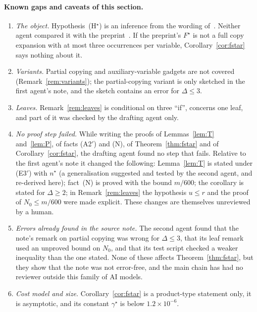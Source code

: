\documentclass[11pt,a4paper]{article}
\theoremstyle{definition}
\theoremstyle{remark}
\begin{document}
\paragraph{Known gaps and caveats of this section.}
\begin{enumerate}
\item \emph{The object.} Hypothesis~(H$^\star$) is an inference from the wording
 of~\cite{DL}. Neither agent compared it with the preprint~\cite{OpenAI}. If the preprint's
 $F^\star$ is not a full copy expansion with at most three occurrences per variable,
 Corollary~\ref{cor:fstar} says nothing about it.
\item \emph{Variants.} Partial copying and auxiliary-variable gadgets are not covered
 (Remark~\ref{rem:variants}); the partial-copying variant is only sketched in the first
 agent's note, and the sketch contains an error for $\Delta\le3$.
\item \emph{Leaves.} Remark~\ref{rem:leaves} is conditional on three ``if'', concerns one
 leaf, and part of it was checked by the drafting agent only.
\item \emph{No proof step failed.} While writing the proofs of Lemmas~\ref{lem:T}
 and~\ref{lem:P}, of facts (A2$'$) and (N), of Theorem~\ref{thm:fstar} and of
 Corollary~\ref{cor:fstar}, the drafting agent found no step that fails. Relative to the
 first agent's note it changed the following: Lemma~\ref{lem:T} is stated under (E3$'$) with
 $n^\star$ (a generalisation suggested and tested by the second agent, and re-derived here);
 fact~(N) is proved with the bound $m/600$; the corollary is stated for $\Delta\ge2$; in
 Remark~\ref{rem:leaves} the hypothesis $u\le r$ and the proof of $N_0\le m/600$ were made
 explicit. These changes are themselves unreviewed by a human.
\item \emph{Errors already found in the source note.} The second agent found that the
 note's remark on partial copying was wrong for $\Delta\le3$, that its leaf remark used an
 unproved bound on $N_0$, and that its test script checked a weaker inequality than the one
 stated. None of these affects Theorem~\ref{thm:fstar}, but they show that the note was not
 error-free, and the main chain has had no reviewer outside this family of AI models.
\item \emph{Cost model and size.} Corollary~\ref{cor:fstar} is a product-type statement
 only, it is asymptotic, and its constant $\gamma^\star$ is below $1.2\times10^{-6}$.
\end{enumerate}
\end{document}
